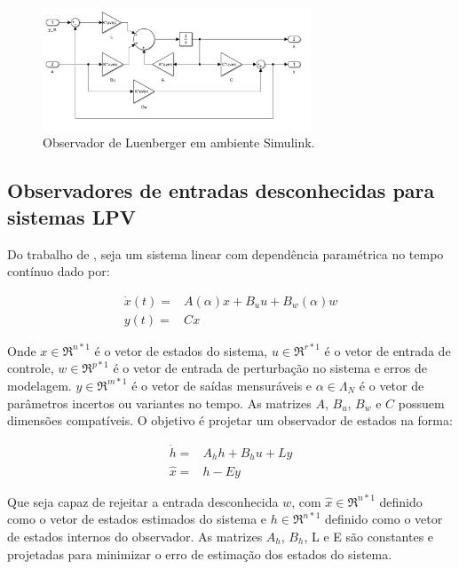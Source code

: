 \FloatBarrier
\begin{figure}[htbp]
    \begin{centering}
        \includegraphics[width=8cm]{img/luenberger_simulink.png}
        \caption{Observador de Luenberger em ambiente Simulink.} 
        \label{fig:luemberger_simulink}
    \end{centering}
\end{figure}
\FloatBarrier

\subsection{Observadores de entradas desconhecidas para sistemas LPV}

Do trabalho de \cite{Dias2022ItaloDias}, seja um sistema linear com dependência paramétrica no tempo contínuo dado por:

\begin{equation}\label{eq:part_linsys}
    \begin{split}
        \dot{x}(t)=&A(\alpha)x+B_uu+B_w(\alpha)w\\
              y(t)=&Cx
    \end{split}
\end{equation}

Onde $x \in \Re^{n*1}$ é o vetor de estados do sistema, $u \in \Re^{r*1}$ é o vetor de entrada de controle, $w \in \Re^{p*1}$ é o vetor de entrada de perturbação no sistema e erros de modelagem.  $y \in \Re^{m*1}$ é o vetor de saídas mensuráveis e  $\alpha \in \Lambda_N$  é o vetor de parâmetros incertos ou variantes no tempo. As matrizes $A$, $B_u$, $B_w$ e $C$ possuem dimensões compatíveis.
O objetivo é projetar um observador de estados na forma:

\begin{equation}\label{eq:UIO}
    \begin{split}
        \dot{h}=&A_hh+B_hu+Ly\\
              \hat{x}=&h-Ey
    \end{split}
\end{equation}

Que seja capaz de rejeitar a entrada desconhecida $w$, com $\hat{x} \in \Re^{n*1}$ definido como o vetor de estados estimados do sistema e $h \in \Re^{n*1}$ definido como o vetor de estados internos do observador. As matrizes $A_h$, $B_h$, L e E são constantes e projetadas para minimizar o erro de estimação dos estados do sistema.

